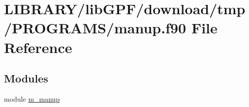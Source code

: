 \hypertarget{manup_8f90}{}\section{L\+I\+B\+R\+A\+R\+Y/lib\+G\+P\+F/download/tmp/\+P\+R\+O\+G\+R\+A\+M\+S/manup.f90 File Reference}
\label{manup_8f90}
\subsection*{Modules}
\begin{DoxyCompactItemize}
\item 
module \hyperlink{namespacem__manup}{m\+\_\+manup}
\end{DoxyCompactItemize}
